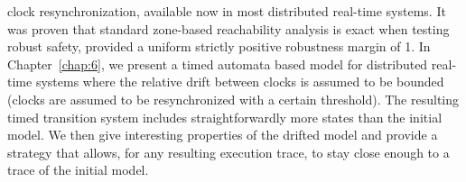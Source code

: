 clock resynchronization, available now in most distributed real-time systems. It was proven
that standard zone-based reachability analysis  is exact when testing robust safety, provided
a uniform strictly positive robustness margin of 1.
In Chapter~\ref{chap:6}, we present a timed automata based model for distributed real-time
systems where the relative drift between clocks is assumed to be bounded (clocks are assumed
to be resynchronized with a certain threshold). The resulting timed transition system 
includes straightforwardly more states than the initial model. We then give interesting 
properties of the drifted model and provide a strategy that allows, for any resulting 
execution trace, to stay close enough to a  trace of the initial model. 
